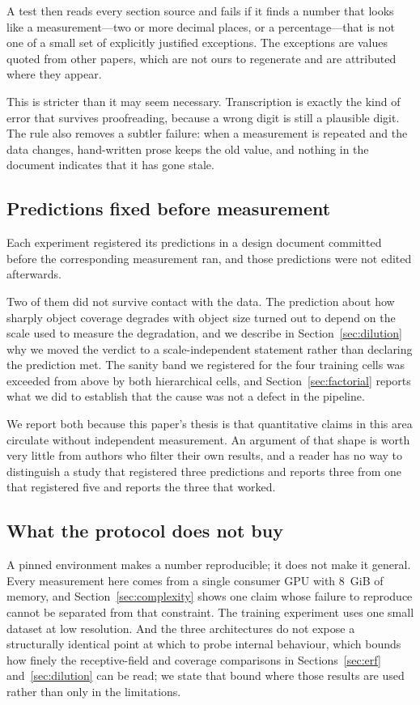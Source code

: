 A test then reads every section source and fails if it finds a number that
looks like a measurement---two or more decimal places, or a percentage---that
is not one of a small set of explicitly justified exceptions. The exceptions
are values quoted from other papers, which are not ours to regenerate and are
attributed where they appear.

This is stricter than it may seem necessary. Transcription is exactly the
kind of error that survives proofreading, because a wrong digit is still a
plausible digit. The rule also removes a subtler failure: when a measurement
is repeated and the data changes, hand-written prose keeps the old value, and
nothing in the document indicates that it has gone stale.

\subsection{Predictions fixed before measurement}

Each experiment registered its predictions in a design document committed
before the corresponding measurement ran, and those predictions were not
edited afterwards.

Two of them did not survive contact with the data. The prediction about how
sharply object coverage degrades with object size turned out to depend on
the scale used to measure the degradation, and we describe in
Section~\ref{sec:dilution} why we moved the verdict to a scale-independent
statement rather than declaring the prediction met. The sanity band we
registered for the four training cells was exceeded from above by both
hierarchical cells, and Section~\ref{sec:factorial} reports what we did to
establish that the cause was not a defect in the pipeline.

We report both because this paper's thesis is that quantitative claims in
this area circulate without independent measurement. An argument of that
shape is worth very little from authors who filter their own results, and a
reader has no way to distinguish a study that registered three predictions
and reports three from one that registered five and reports the three that
worked.

\subsection{What the protocol does not buy}

A pinned environment makes a number reproducible; it does not make it
general. Every measurement here comes from a single consumer GPU with 8~GiB
of memory, and Section~\ref{sec:complexity} shows one claim whose failure to
reproduce cannot be separated from that constraint. The training experiment
uses one small dataset at low resolution. And the three architectures do not
expose a structurally identical point at which to probe internal behaviour,
which bounds how finely the receptive-field and coverage comparisons in
Sections~\ref{sec:erf} and~\ref{sec:dilution} can be read; we state that
bound where those results are used rather than only in the limitations.
